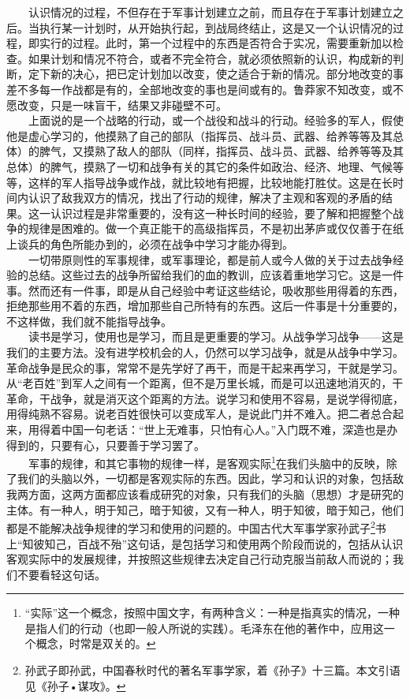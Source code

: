 \documentclass[cn,11pt,chinese]{elegantbook}
\begin{document}
　　认识情况的过程，不但存在于军事计划建立之前，而且存在于军事计划建立之后。当执行某一计划时，从开始执行起，到战局终结止，这是又一个认识情况的过程，即实行的过程。此时，第一个过程中的东西是否符合于实况，需要重新加以检查。如果计划和情况不符合，或者不完全符合，就必须依照新的认识，构成新的判断，定下新的决心，把已定计划加以改变，使之适合于新的情况。部分地改变的事差不多每一作战都是有的，全部地改变的事也是间或有的。鲁莽家不知改变，或不愿改变，只是一味盲干，结果又非碰壁不可。\\
　　上面说的是一个战略的行动，或一个战役和战斗的行动。经验多的军人，假使他是虚心学习的，他摸熟了自己的部队（指挥员、战斗员、武器、给养等等及其总体）的脾气，又摸熟了敌人的部队（同样，指挥员、战斗员、武器、给养等等及其总体）的脾气，摸熟了一切和战争有关的其它的条件如政治、经济、地理、气候等等，这样的军人指导战争或作战，就比较地有把握，比较地能打胜仗。这是在长时间内认识了敌我双方的情况，找出了行动的规律，解决了主观和客观的矛盾的结果。这一认识过程是非常重要的，没有这一种长时间的经验，要了解和把握整个战争的规律是困难的。做一个真正能干的高级指挥员，不是初出茅庐或仅仅善于在纸上谈兵的角色所能办到的，必须在战争中学习才能办得到。\\
　　一切带原则性的军事规律，或军事理论，都是前人或今人做的关于过去战争经验的总结。这些过去的战争所留给我们的血的教训，应该着重地学习它。这是一件事。然而还有一件事，即是从自己经验中考证这些结论，吸收那些用得着的东西，拒绝那些用不着的东西，增加那些自己所特有的东西。这后一件事是十分重要的，不这样做，我们就不能指导战争。\\
　　读书是学习，使用也是学习，而且是更重要的学习。从战争学习战争——这是我们的主要方法。没有进学校机会的人，仍然可以学习战争，就是从战争中学习。革命战争是民众的事，常常不是先学好了再干，而是干起来再学习，干就是学习。从“老百姓”到军人之间有一个距离，但不是万里长城，而是可以迅速地消灭的，干革命，干战争，就是消灭这个距离的方法。说学习和使用不容易，是说学得彻底，用得纯熟不容易。说老百姓很快可以变成军人，是说此门并不难入。把二者总合起来，用得着中国一句老话：“世上无难事，只怕有心人。”入门既不难，深造也是办得到的，只要有心，只要善于学习罢了。\\
　　军事的规律，和其它事物的规律一样，是客观实际\footnote[1]{ “实际”这一个概念，按照中国文字，有两种含义：一种是指真实的情况，一种是指人们的行动（也即一般人所说的实践）。毛泽东在他的著作中，应用这一个概念，时常是双关的。}在我们头脑中的反映，除了我们的头脑以外，一切都是客观实际的东西。因此，学习和认识的对象，包括敌我两方面，这两方面都应该看成研究的对象，只有我们的头脑（思想）才是研究的主体。有一种人，明于知己，暗于知彼，又有一种人，明于知彼，暗于知己，他们都是不能解决战争规律的学习和使用的问题的。中国古代大军事学家孙武子\footnote[2]{ 孙武子即孙武，中国春秋时代的著名军事学家，着《孙子》十三篇。本文引语见《孙子•谋攻》。}书上“知彼知己，百战不殆”这句话，是包括学习和使用两个阶段而说的，包括从认识客观实际中的发展规律，并按照这些规律去决定自己行动克服当前敌人而说的；我们不要看轻这句话。\\
\end{document}

